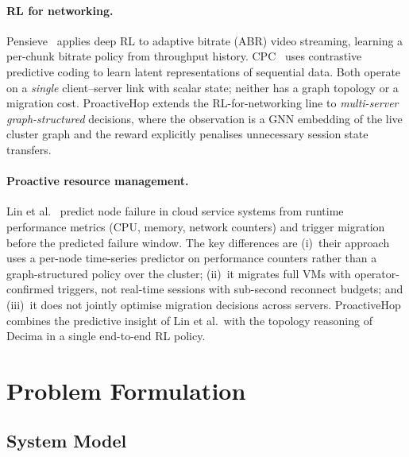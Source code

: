 \documentclass[review,1p]{elsarticle}
\theoremstyle{definition}
\begin{document}
\paragraph{RL for networking.}
Pensieve~\cite{lbgnn} applies deep RL to adaptive bitrate (ABR) video
streaming, learning a per-chunk bitrate policy from throughput history.
CPC~\cite{cpc2019} uses contrastive predictive coding to learn latent
representations of sequential data.
Both operate on a \emph{single} client--server link with scalar state;
neither has a graph topology or a migration cost.  ProactiveHop extends
the RL-for-networking line to \emph{multi-server graph-structured}
decisions, where the observation is a GNN embedding of the live
cluster graph and the reward explicitly penalises unnecessary
session state transfers.

\paragraph{Proactive resource management.}
Lin et al.~\cite{prophet2020} predict node failure in cloud service
systems from runtime performance metrics (CPU, memory, network counters)
and trigger migration before the predicted failure window.
The key differences are (i)~their approach uses a
per-node time-series predictor on performance counters rather than a
graph-structured policy over the cluster; (ii)~it migrates full
VMs with operator-confirmed triggers, not real-time sessions with
sub-second reconnect budgets; and (iii)~it does not jointly
optimise migration decisions across servers.  ProactiveHop combines
the predictive insight of Lin et al.\ with the topology reasoning of
Decima in a single end-to-end RL policy.

\section{Problem Formulation}
\label{sec:formulation}

\subsection{System Model}
\end{document}
